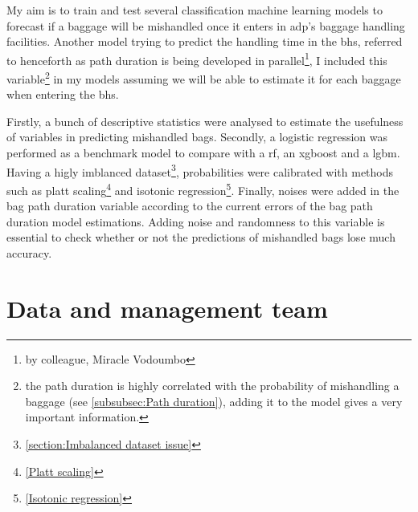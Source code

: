 \documentclass[12pt]{article}
\begin{document}
My aim is to train and test several classification machine learning models to forecast if a baggage will be mishandled once it enters in \acrshort{adp}'s baggage handling facilities. Another model trying to predict the handling time in the \acrshort{bhs}, referred to henceforth as path duration is being developed in parallel\footnote{by colleague, Miracle Vodoumbo}, I included this variable\footnote{the path duration is highly correlated with the probability of mishandling a baggage (see \autoref{subsubsec:Path duration}), adding it to the model gives a very important information.} in my models assuming we will be able to estimate it for each baggage when entering the \acrshort{bhs}.  \hfill \break

Firstly, a bunch of descriptive statistics were analysed to estimate the usefulness of variables in predicting mishandled bags. \hfill \break
\noindent Secondly, a logistic regression was performed as a benchmark model to compare with a \acrlong{rf}, an \acrlong{xgboost} and a \acrlong{lgbm}. Having a higly imblanced dataset\footnote{\autoref{section:Imbalanced dataset issue}}, probabilities were calibrated with methods such as platt scaling\footnote{\autoref{Platt scaling}} and isotonic regression\footnote{\autoref{Isotonic regression}}. \hfill \break 
\noindent Finally, noises were added in the bag path duration variable according to the current errors of the bag path duration model estimations. Adding noise and randomness to this variable is essential to check whether or not the predictions of mishandled bags lose much accuracy.




\newpage
\section{Data and management team}
\end{document}
